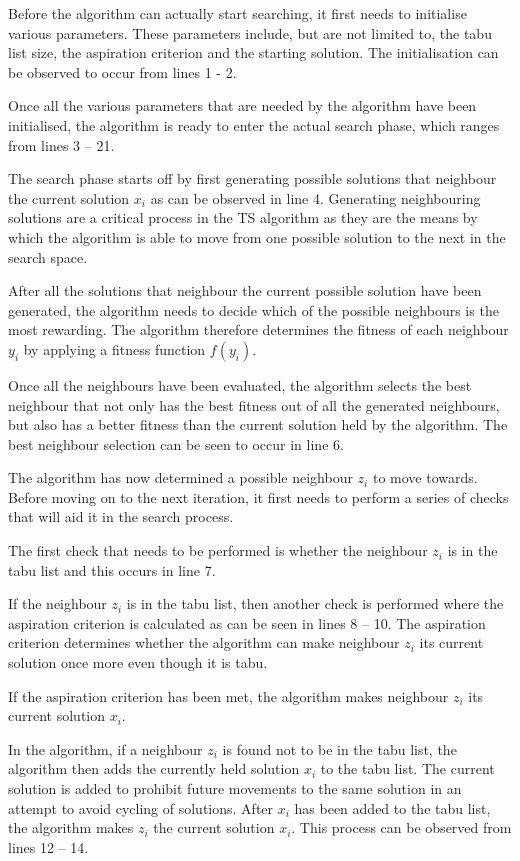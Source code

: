 Before the algorithm can actually start searching, it first needs to initialise various parameters. These parameters include, but are not limited to, the tabu list size, the aspiration criterion and the starting solution. The initialisation can be observed to occur from lines 1 - 2.

Once all the various parameters that are needed by the algorithm have been initialised, the algorithm is ready to enter the actual search phase, which ranges from lines 3 -- 21. 

The search phase starts off by first generating possible solutions that neighbour the current solution $x_i$ as can be observed in line 4. Generating neighbouring solutions are a critical process in the \gls{TS} algorithm as they are the means by which the algorithm is able to move from one possible solution to the next in the search space.

After all the solutions that neighbour the current possible solution have been generated, the algorithm needs to decide which of the possible neighbours is the most rewarding. The algorithm therefore determines the fitness of each neighbour $y_i$ by applying a fitness function $f(y_i)$. 

Once all the neighbours have been evaluated, the algorithm selects the best neighbour that not only has the best fitness out of all the generated neighbours, but also has a better fitness than the current solution held by the algorithm. The best neighbour selection can be seen to occur in line 6.

The algorithm has now determined a possible neighbour $z_i$ to move towards. Before moving on to the next iteration, it first needs to perform a series of checks that will aid it in the search process.

The first check that needs to be performed is whether the neighbour $z_i$ is in the tabu list and this occurs in line 7. 

If the neighbour $z_i$ is in the tabu list, then another check is performed where the aspiration criterion is calculated as can be seen in lines 8 -- 10. The aspiration criterion determines whether the algorithm can make neighbour $z_i$ its current solution once more even though it is tabu. 

If the aspiration criterion has been met, the algorithm makes neighbour $z_i$ its current solution $x_i$. 

In the algorithm, if a neighbour $z_i$ is found not to be in the tabu list, the algorithm then adds the currently held solution $x_i$ to the tabu list. The current solution is added to prohibit future movements to the same solution in an attempt to avoid cycling of solutions. After $x_i$ has been added to the tabu list, the algorithm makes $z_i$ the current solution $x_i$. This process can be observed from lines 12 -- 14.

